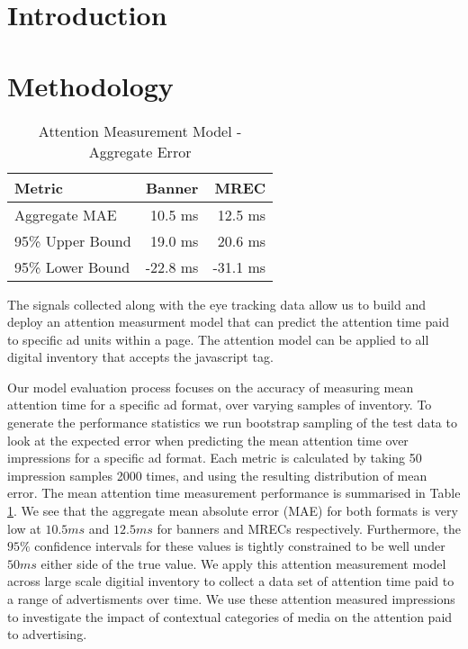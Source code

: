 \documentclass[sigconf]{acmart}
\begin{document}



\maketitle

\section{Introduction}

\section{Methodology}


\begin{table}
  \caption{Attention Measurement Model - Aggregate Error}
  \label{tab:atm}
\begin{tabular}{|l|r|r|}
\toprule
Metric                  &Banner       &MREC       \\
\midrule
Aggregate MAE           &10.5 ms      &12.5 ms    \\
95\% Upper Bound        &19.0 ms      &20.6 ms    \\
95\% Lower Bound        &-22.8 ms     &-31.1 ms   \\
  \bottomrule
\end{tabular}
\end{table}

The signals collected along with the eye tracking data allow us to build and deploy an
attention measurment model that can predict the attention time paid to
specific ad units within a page. The attention model can
be applied to all digital inventory that accepts the javascript tag.

Our model evaluation process focuses on the accuracy of measuring mean
attention time for a specific ad format, over varying samples of inventory.
To generate the performance statistics we run bootstrap sampling of the test data
to look at the expected error when predicting the mean attention time over
impressions for a specific ad format. Each metric is calculated by taking 50 impression
samples 2000 times, and using the resulting distribution of mean error.
The mean attention time measurement performance is summarised in Table
\ref{tab:atm}.
We see that the aggregate mean absolute error (MAE) for both formats is very low
at $10.5 ms$ and $12.5 ms$ for banners and MRECs respectively. Furthermore, the
$95\%$ confidence intervals for these values is tightly constrained to be well under
$50 ms$ either side of the true value.
We apply this attention measurement model across large scale digitial inventory to
collect a data set of attention time paid to a range of advertisments over time.
We use these attention measured impressions to investigate the
impact of contextual categories of media on the attention paid to advertising.
\end{document}
